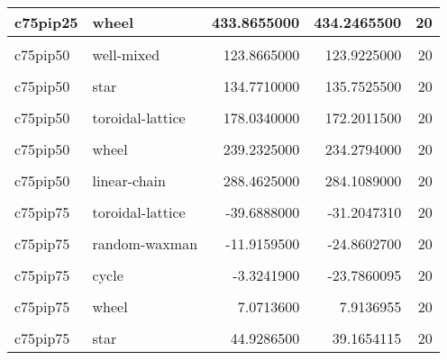 \documentclass[
]{book}
\begin{document}
\begin{table}
\begin{tabular}{l|l|r|r|r}
\hline
c75pip25 & wheel & 433.8655000 & 434.2465500 & 20\\
\hline
\cellcolor{gray!6}{c75pip50} & \cellcolor{gray!6}{comet-kite} & \cellcolor{gray!6}{93.4602000} & \cellcolor{gray!6}{96.4563600} & \cellcolor{gray!6}{20}\\
\hline
c75pip50 & well-mixed & 123.8665000 & 123.9225000 & 20\\
\hline
\cellcolor{gray!6}{c75pip50} & \cellcolor{gray!6}{random-barabasi-albert} & \cellcolor{gray!6}{124.6680000} & \cellcolor{gray!6}{124.4696500} & \cellcolor{gray!6}{20}\\
\hline
c75pip50 & star & 134.7710000 & 135.7525500 & 20\\
\hline
\cellcolor{gray!6}{c75pip50} & \cellcolor{gray!6}{random-waxman} & \cellcolor{gray!6}{149.6610000} & \cellcolor{gray!6}{149.9015700} & \cellcolor{gray!6}{20}\\
\hline
c75pip50 & toroidal-lattice & 178.0340000 & 172.2011500 & 20\\
\hline
\cellcolor{gray!6}{c75pip50} & \cellcolor{gray!6}{windmill} & \cellcolor{gray!6}{189.2315000} & \cellcolor{gray!6}{176.3785000} & \cellcolor{gray!6}{20}\\
\hline
c75pip50 & wheel & 239.2325000 & 234.2794000 & 20\\
\hline
\cellcolor{gray!6}{c75pip50} & \cellcolor{gray!6}{cycle} & \cellcolor{gray!6}{274.0830000} & \cellcolor{gray!6}{272.9407000} & \cellcolor{gray!6}{20}\\
\hline
c75pip50 & linear-chain & 288.4625000 & 284.1089000 & 20\\
\hline
\cellcolor{gray!6}{c75pip75} & \cellcolor{gray!6}{linear-chain} & \cellcolor{gray!6}{-48.6068000} & \cellcolor{gray!6}{-48.5231200} & \cellcolor{gray!6}{20}\\
\hline
c75pip75 & toroidal-lattice & -39.6888000 & -31.2047310 & 20\\
\hline
\cellcolor{gray!6}{c75pip75} & \cellcolor{gray!6}{random-barabasi-albert} & \cellcolor{gray!6}{-38.4254000} & \cellcolor{gray!6}{-33.0213640} & \cellcolor{gray!6}{20}\\
\hline
c75pip75 & random-waxman & -11.9159500 & -24.8602700 & 20\\
\hline
\cellcolor{gray!6}{c75pip75} & \cellcolor{gray!6}{windmill} & \cellcolor{gray!6}{-10.3426000} & \cellcolor{gray!6}{-21.3472448} & \cellcolor{gray!6}{20}\\
\hline
c75pip75 & cycle & -3.3241900 & -23.7860095 & 20\\
\hline
\cellcolor{gray!6}{c75pip75} & \cellcolor{gray!6}{comet-kite} & \cellcolor{gray!6}{2.2869400} & \cellcolor{gray!6}{-17.2844405} & \cellcolor{gray!6}{20}\\
\hline
c75pip75 & wheel & 7.0713600 & 7.9136955 & 20\\
\hline
\cellcolor{gray!6}{c75pip75} & \cellcolor{gray!6}{well-mixed} & \cellcolor{gray!6}{16.4932500} & \cellcolor{gray!6}{-30.4982045} & \cellcolor{gray!6}{20}\\
\hline
c75pip75 & star & 44.9286500 & 39.1654115 & 20\\
\hline
\end{tabular}
\end{table}
\end{document}
